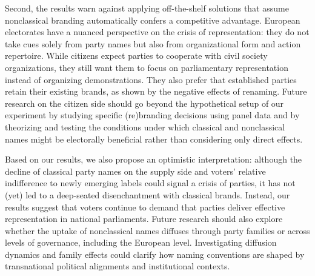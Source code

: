 \documentclass[12pt]{article}
\begin{document}
Second, the results warn against applying off-the-shelf solutions that assume nonclassical branding automatically confers a competitive advantage. European electorates have a nuanced perspective on the crisis of representation: they do not take cues solely from party names but also from organizational form and action repertoire. While citizens expect parties to cooperate with civil society organizations, they still want them to focus on parliamentary representation instead of organizing demonstrations. They also prefer that established parties retain their existing brands, as shown by the negative effects of renaming. Future research on the citizen side should go beyond the hypothetical setup of our experiment by studying specific (re)branding decisions using panel data and by theorizing and testing the conditions under which classical and nonclassical names might be electorally beneficial rather than considering only direct effects.

Based on our results, we also propose an optimistic interpretation: although the decline of classical party names on the supply side and voters' relative indifference to newly emerging labels could signal a crisis of parties, it has not (yet) led to a deep-seated disenchantment with classical brands. Instead, our results suggest that voters continue to demand that parties deliver effective representation in national parliaments. Future research should also explore whether the uptake of nonclassical names diffuses through party families or across levels of governance, including the European level. Investigating diffusion dynamics and family effects could clarify how naming conventions are shaped by transnational political alignments and institutional contexts.

\singlespacing


\end{document}
